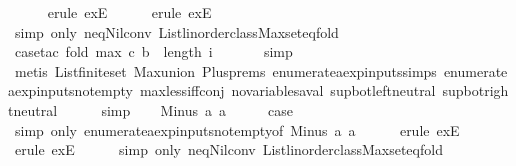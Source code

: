 \begin{isabellebody}
\ \ \ \ \isamarkupfalse%
\ {\isacharparenleft}erule\ exE{\isacharparenright}\isanewline
\ \ \ \ \isamarkupfalse%
\ {\isacharparenleft}erule\ exE{\isacharparenright}\isanewline
\ \ \ \ \isamarkupfalse%
\ {\isacharparenleft}simp\ only{\isacharcolon}\ neq{\isacharunderscore}Nil{\isacharunderscore}conv\ List{\isachardot}linorder{\isacharunderscore}class{\isachardot}Max{\isachardot}set{\isacharunderscore}eq{\isacharunderscore}fold{\isacharparenright}\isanewline
\ \ \ \ \isamarkupfalse%
\ {\isacharparenleft}case{\isacharunderscore}tac\ {\isachardoublequoteopen}fold\ max\ c\ b\ {\isasymle}\ length\ i{\isachardoublequoteclose}{\isacharparenright}\isanewline
\ \ \ \ \ \isamarkupfalse%
\ simp\isanewline
\ \ \ \ \ \isamarkupfalse%
\ {\isacharparenleft}metis\ List{\isachardot}finite{\isacharunderscore}set\ Max{\isachardot}union\ Plus{\isachardot}prems{\isacharparenleft}{}{\isacharparenright}\ enumerate{\isacharunderscore}aexp{\isacharunderscore}inputs{\isachardot}simps{\isacharparenleft}{}{\isacharparenright}\ enumerate{\isacharunderscore}aexp{\isacharunderscore}inputs{\isacharunderscore}not{\isacharunderscore}empty\ max{\isacharunderscore}less{\isacharunderscore}iff{\isacharunderscore}conj\ no{\isacharunderscore}variables{\isacharunderscore}aval\ sup{\isacharunderscore}bot{\isachardot}left{\isacharunderscore}neutral\ sup{\isacharunderscore}bot{\isachardot}right{\isacharunderscore}neutral{\isacharparenright}\isanewline
\ \ \ \ \isamarkupfalse%
\ simp\isanewline
{}\isamarkupfalse%
\isanewline
\ \ \isamarkupfalse%
\ {\isacharparenleft}Minus\ a{}\ a{}{\isacharparenright}\isanewline
\ \ \isamarkupfalse%
\ \isamarkupfalse%
\ {\isacharquery}case\isanewline
\ \ \ \ \isamarkupfalse%
\ {\isacharparenleft}simp\ only{\isacharcolon}\ enumerate{\isacharunderscore}aexp{\isacharunderscore}inputs{\isacharunderscore}not{\isacharunderscore}empty{\isacharbrackleft}of\ {\isachardoublequoteopen}Minus\ a{}\ a{}{\isachardoublequoteclose}{\isacharbrackright}{\isacharparenright}\isanewline
\ \ \ \ \isamarkupfalse%
\ {\isacharparenleft}erule\ exE{\isacharparenright}\isanewline
\ \ \ \ \isamarkupfalse%
\ {\isacharparenleft}erule\ exE{\isacharparenright}\isanewline
\ \ \ \ \isamarkupfalse%
\ {\isacharparenleft}simp\ only{\isacharcolon}\ neq{\isacharunderscore}Nil{\isacharunderscore}conv\ List{\isachardot}linorder{\isacharunderscore}class{\isachardot}Max{\isachardot}set{\isacharunderscore}eq{\isacharunderscore}fold{\isacharparenright}\isanewline

\end{isabellebody}
